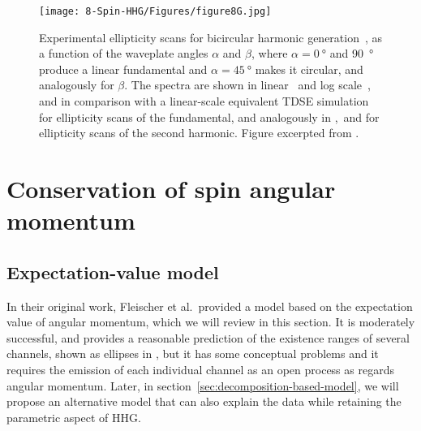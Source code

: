 \begin{figure}[t!]
  \centering
  \subfigure{\label{f8-fleischer-ellipticity-scan-a}}
  \subfigure{\label{f8-fleischer-ellipticity-scan-b}}
  \subfigure{\label{f8-fleischer-ellipticity-scan-c}}
  \subfigure{\label{f8-fleischer-ellipticity-scan-d}}
  \subfigure{\label{f8-fleischer-ellipticity-scan-e}}
  \subfigure{\label{f8-fleischer-ellipticity-scan-f}}
  \texttt{[image: 8-Spin-HHG/Figures/figure8G.jpg]}
  \caption[
  Experimental ellipticity scans on the drivers for bicircular HHG, as observed by A. Fleischer~et~al.
  ]{
  Experimental ellipticity scans for bicircular harmonic generation~\cite{fleischer_spin_2014}, as a function of the waveplate angles $\alpha$ and $\beta$, where $\alpha=\SI{0}{\degree}$ and \SI{90}{\degree} produce a linear fundamental and $\alpha=\SI{45}{\degree}$ makes it circular, and analogously for $\beta$. The spectra are shown in linear~\protect{} and log scale~\protect{}, and in comparison with a linear-scale equivalent TDSE simulation~\protect{} for ellipticity scans of the fundamental, and analogously in \protect{},\,\protect{} and \protect{} for ellipticity scans of the second harmonic.
  Figure excerpted from .
  }
  \label{f8-fleischer-ellipticity-scan}
\end{figure}










\section{Conservation of spin angular momentum}

\subsection{Expectation-value model}
\label{sec:expectation-value-model}
In their original work, Fleischer et al.\ provided a model based on the expectation value of angular momentum, which we will review in this section. It is moderately successful, and provides a reasonable prediction of the existence ranges of several channels, shown as ellipses in , but it has some conceptual problems and it requires the emission of each individual channel as an open process as regards angular momentum. Later, in section~\ref{sec:decomposition-based-model}, we will propose an alternative model that can also explain the data while retaining the parametric aspect of HHG.


